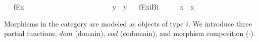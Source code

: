 \begin{isabellebody}
\ \isamarkupfalse%
\ fEx\ \ \ \ \ {\isacharparenleft}{\isachardoublequoteopen}\isactrlbold {\isasymexists}{\isachardoublequoteclose}{\isacharparenright}\ \ \ \ \ \ \ \ \ \ \ \ \ \ \ \ \ \ {\isachardoublequoteopen}\isactrlbold {\isasymexists}{\isasymPhi}\ {\isasymequiv}\ \isactrlbold {\isasymnot}{\isacharparenleft}\isactrlbold {\isasymforall}{\isacharparenleft}{\isasymlambda}y{\isachardot}\ \isactrlbold {\isasymnot}{\isacharparenleft}{\isasymPhi}\ y{\isacharparenright}{\isacharparenright}{\isacharparenright}{\isachardoublequoteclose}\isanewline
\ \isamarkupfalse%
\ fExiBi\ {\isacharparenleft}\ {\isachardoublequoteopen}\isactrlbold {\isasymexists}{\isachardoublequoteclose}\ {\isacharbrackleft}{}{\isacharbrackright}{}{\isacharparenright}\ \ \ {\isachardoublequoteopen}\isactrlbold {\isasymexists}x{\isachardot}\ {\isasymphi}\ x\ {\isasymequiv}\ \isactrlbold {\isasymexists}{\isasymphi}{\isachardoublequoteclose}%
\isamarkuptrue%
%
\begin{isamarkuptext}%
Morphisms in the category are modeled as objects of type $i$. 
We introduce three partial functions, 
$dom$ (domain), $cod$ (codomain), and morphism composition ($\cdot$). 


\end{isamarkuptext}
\end{isabellebody}
